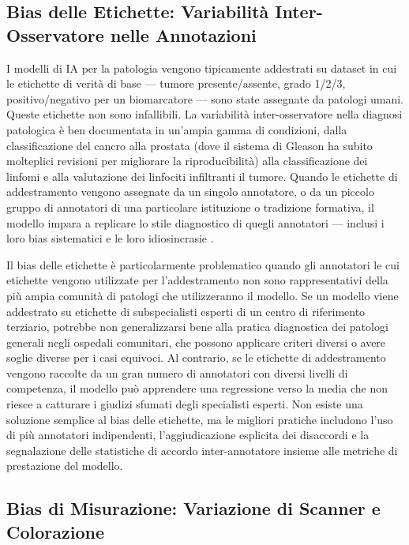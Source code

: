 \subsection{Bias delle Etichette: Variabilità Inter-Osservatore nelle Annotazioni}

I modelli di IA per la patologia vengono tipicamente addestrati su dataset in cui le etichette di verità di base — tumore presente/assente, grado 1/2/3, positivo/negativo per un biomarcatore — sono state assegnate da patologi umani. Queste etichette non sono infallibili. La variabilità inter-osservatore nella diagnosi patologica è ben documentata in un'ampia gamma di condizioni, dalla classificazione del cancro alla prostata (dove il sistema di Gleason ha subito molteplici revisioni per migliorare la riproducibilità) alla classificazione dei linfomi e alla valutazione dei linfociti infiltranti il tumore. Quando le etichette di addestramento vengono assegnate da un singolo annotatore, o da un piccolo gruppo di annotatori di una particolare istituzione o tradizione formativa, il modello impara a replicare lo stile diagnostico di quegli annotatori — inclusi i loro bias sistematici e le loro idiosincrasie \cite{bankhead2022}.

Il bias delle etichette è particolarmente problematico quando gli annotatori le cui etichette vengono utilizzate per l'addestramento non sono rappresentativi della più ampia comunità di patologi che utilizzeranno il modello. Se un modello viene addestrato su etichette di subspecialisti esperti di un centro di riferimento terziario, potrebbe non generalizzarsi bene alla pratica diagnostica dei patologi generali negli ospedali comunitari, che possono applicare criteri diversi o avere soglie diverse per i casi equivoci. Al contrario, se le etichette di addestramento vengono raccolte da un gran numero di annotatori con diversi livelli di competenza, il modello può apprendere una regressione verso la media che non riesce a catturare i giudizi sfumati degli specialisti esperti. Non esiste una soluzione semplice al bias delle etichette, ma le migliori pratiche includono l'uso di più annotatori indipendenti, l'aggiudicazione esplicita dei disaccordi e la segnalazione delle statistiche di accordo inter-annotatore insieme alle metriche di prestazione del modello.

\subsection{Bias di Misurazione: Variazione di Scanner e Colorazione}

